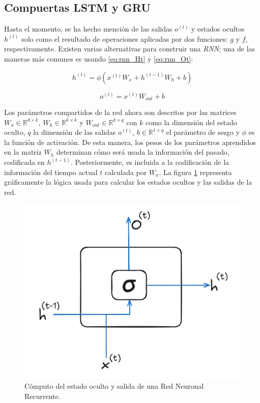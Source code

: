 \subsection{Compuertas LSTM y GRU}

Hasta el momento, se ha hecho mención de las salidas $o^{(t)}$ y estados ocultos $h^{(t)}$ solo como
el resultado de operaciones aplicadas por dos funciones: $g$ y $f$, respectivamente. Existen varias
alternativas para construir una \textit{RNN}; una de las maneras más comunes es usando
\ref{eq:rnn_Ht} y \ref{eq:rnn_Ot}:


\begin{equation}
    h^{(t)} = \phi(x^{(t)} W_{x} + h^{(t-1)} W_h + b)
    \label{eq:rnn_Ht}
\end{equation}

\begin{equation}
    o^{(t)} = x^{(t)} W_{out} + b
    \label{eq:rnn_Ot}
\end{equation}

Los parámetros compartidos de la red ahora son descritos por las matrices
$W_x \in \mathbb{R}^{d \times k}$, $W_h \in \mathbb{R}^{k \times k}$ y
$W_{out} \in \mathbb{R}^{k \times q}$ con $k$ como la dimensión del estado oculto, $q$ la dimensión
de las salidas $o^{(t)}$, $b \in \mathbb{R} ^ {1 \times q}$ el parámetro de sesgo y $\phi$ es la
función de activación. De esta manera, los pesos de los parámetros aprendidos en la matriz $W_h$
determinan cómo será usada la información del pasado, codificada en $h^{(t-1)}$. Posteriormente,
es incluida a la codificación de la información del tiempo actual $t$ calculada por $W_x$.
La figura \ref{fig:rnn_cell} representa gráficamente la lógica usada para calcular los estados
ocultos y las salidas de la red.

\begin{figure}[ht!]
\centering
\includegraphics[width=0.4 \textwidth]{Chapters/2. Transformer/Figures/rnn/rnn_cell.png}
\caption{Cómputo del estado oculto y salida de una Red Neuronal Recurrente.}
\label{fig:rnn_cell}
\end{figure}

